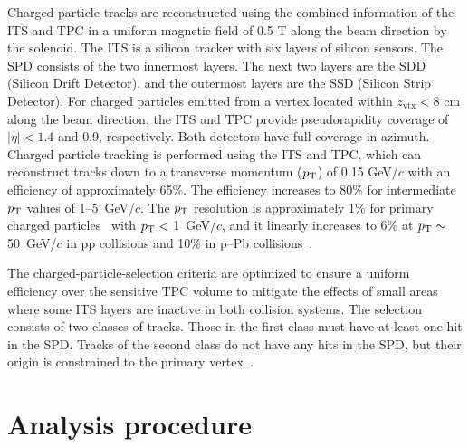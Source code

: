 Charged-particle tracks are reconstructed using the combined information of the ITS and TPC in a uniform magnetic field of 0.5 T along the beam direction by the solenoid. The ITS is a silicon tracker with six layers of silicon sensors. The SPD consists of the two innermost layers. The next two layers are the SDD (Silicon Drift Detector), and the outermost layers are the SSD (Silicon Strip Detector). 
For charged particles emitted from a vertex located within $z_\mathrm{vtx}<8$ cm along the beam direction, the ITS and TPC provide pseudorapidity coverage of $|\eta|<1.4$ and 0.9, respectively. Both detectors have full coverage in azimuth. 
Charged particle tracking is performed using the ITS and TPC, which can reconstruct tracks down to a transverse momentum ($p_\mathrm{T}$) of 0.15 GeV/$c$ with an efficiency of approximately 65\%. The efficiency increases to 80\% for intermediate $p_\mathrm{T}$ values of 1--5~GeV/$c$. The $p_\mathrm{T}$ resolution is approximately 1\% for primary charged particles~\cite{ALICE-PUBLIC-2017-005} with $p_\mathrm{T}<$ 1~GeV/$c$, and it linearly increases to 6\% at $p_\mathrm{T}\sim$ 50~GeV/$c$ in pp collisions and 10\% in p--Pb collisions~\cite{ALICE:2018vuu}.

The charged-particle-selection criteria are optimized to ensure a uniform efficiency over the sensitive TPC volume to mitigate the effects of small areas where some ITS layers are inactive in both collision systems. The selection consists of two classes of tracks. Those in the first class must have at least one hit in the SPD. Tracks of the second class do not have any hits in the SPD, but their origin is constrained to the primary vertex~\cite{ALICE:2012eyl}. 

\section{Analysis procedure}
\label{sec:ana}
